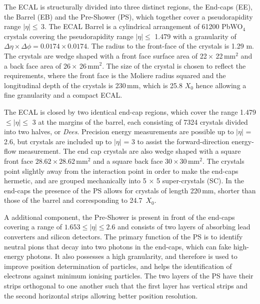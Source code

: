 The ECAL is structurally divided into three distinct regions, the End-caps (EE), the Barrel (EB) and the Pre-Shower (PS), which together cover a pseudorapidity range $|\eta| \leq$\,3. The ECAL Barrel is a cylindrical arrangement of 61200 PbWO$_{4}$ crystals covering the pseudorapidity range $|\eta| \leq$ 1.479 with a granularity of $\Delta \eta \times \Delta \phi = 0.0174 \times 0.0174$. The radius to the front-face of the crystals is 1.29 m. The crystals are wedge shaped with a front face surface area of 22\,$\times$ 22\,mm$^{2}$ and a back face area of 26\,$\times$ 26\,mm$^{2}$. The size of the crystal is chosen to reflect the requirements, where the front face is the Moliere radius squared and the longitudinal depth of the crystals is 230\,mm, which is 25.8 $X_{0}$ hence allowing a fine granularity and a compact ECAL. 


The ECAL is closed by two identical end-cap regions, which cover the range 1.479 $\leq |\eta| \leq$ 3 at the margins of the barrel, each consisting of 7324 crystals divided into two halves, or \textit{Dees}. Precision energy measurements are possible up to $|\eta|$ = 2.6, but crystals are included up to $|\eta|$ = 3 to assist the forward-direction energy-flow measurement. The end cap crystals are also wedge shaped with a square front face $28.62 \times 28.62$\,mm$^{2}$ and a square back face $30 \times 30$\,mm$^{2}$. The crystals point slightly away from the interaction point in order to make the end-caps hermetic, and are grouped mechanically into 5 $\times$ 5 super-crystals (SC). In the end-caps the presence of the PS allows for crystals of length 220\,mm, shorter than those of the barrel and corresponding to 24.7~$X_{0}$.

A additional component, the Pre-Shower is present in front of the end-caps covering a range of $1.653\leq |\eta|\leq2.6$ and consists of two layers of absorbing lead converters and silicon detectors. The primary function of the PS is to identify neutral pions that decay into two photons in the end-caps, which can fake high-energy photons. It also possesses a high granularity, and therefore is used to improve position determination of particles, and helps the identification of electrons against minimum ionising particles. The two layers of the PS have their strips orthogonal to one another such that the first layer has vertical strips and the second horizontal strips allowing better position resolution.


